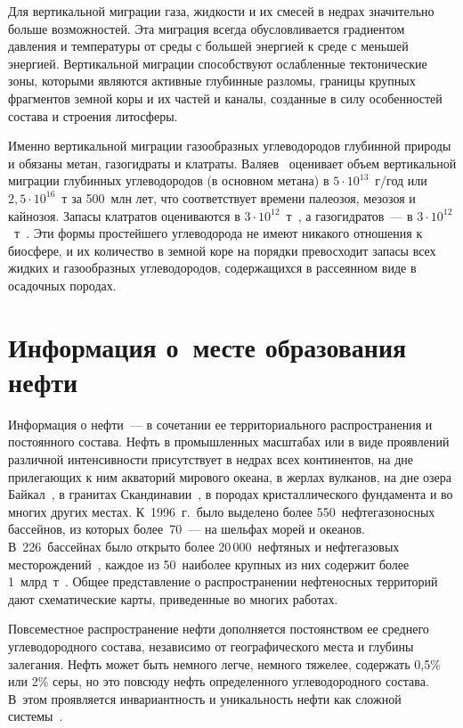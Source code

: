 \begin{multicols}{2}
     Для вертикальной миграции газа, жидкости и их смесей в недрах значительно 
больше возможностей. Эта миграция всегда обусловливается градиентом давления 
и температуры от среды с большей энергией к среде с меньшей энергией. 
Вертикальной миграции способствуют ослабленные тектонические зоны, 
которыми являются активные глубинные разломы, границы крупных фрагментов 
земной коры и их частей и каналы, созданные в силу особенностей состава и 
строения литосферы.
     
     Именно вертикальной миграции газообразных углеводородов глубинной 
природы и обязаны метан, газогидраты и клатраты. Валяев~\cite{6s} 
оценивает объем вертикальной миграции глубинных углеводородов (в основном 
метана) в $5\cdot 10^{13}$~г/год или $2{,}5\cdot 10^{16}$~т за 500~млн лет, что 
соответствует времени палеозоя, мезозоя и кайнозоя. Запасы клатратов 
оцениваются в $3\cdot 10^{12}$~т~\cite{17s}, а газогидратов~--- в $3\cdot
10^{12}$~т~\cite{26s}. Эти формы простейшего углеводорода не имеют никакого 
отношения к биосфере, и их количество в земной коре на порядки превосходит 
запасы всех жидких и газообразных углеводородов, содержащихся в рассеянном 
виде в осадочных породах.
     
\section{Информация о~месте образования нефти}

     Информация о нефти~--- в сочетании ее территориального распространения и 
постоянного состава. Нефть в промышленных масштабах или в виде проявлений 
различной интенсивности присутствует в недрах всех континентов, на дне 
прилегающих к ним акваторий мирового океана, в жерлах вулканов, на дне озера 
Байкал~\cite{2s}, в гранитах Скандинавии~\cite{30s}, в породах кристаллического 
фундамента и во многих других местах. К~1996~г.\ было выделено более 
550~нефтегазоносных бассейнов, из которых более~70~--- на шельфах морей и 
океанов. В~226~бассейнах было открыто более 20\,000~нефтяных и нефтегазовых 
месторождений~\cite{15s}, каждое из 50~наиболее крупных из них содержит более 
1~млрд~т~\cite{11s}. Общее представление о распространении нефтеносных 
территорий дают схематические карты, приведенные во многих работах. 
     
     Повсеместное распространение нефти дополняется постоянством ее среднего 
углеводородного состава, независимо от географического места и глубины 
залегания. Нефть может быть немного легче, немного тяжелее, содержать 0,5\% 
или 2\% серы, но это повсюду нефть определенного углеводородного состава. 
В~этом проявляется инвариантность и уникальность нефти как сложной 
системы~\cite{21s}.
     

\end{multicols}
